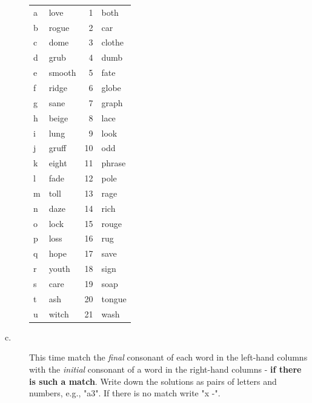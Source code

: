 \documentclass[11pt]{article}
\begin{document}
\begin{problem}{2}
\begin{description}
	\begin{tabular}{l p{6cm} | r l}
		a & love & 1 & both \\
		b & rogue & 2 & car \\
		c & dome & 3 & clothe \\
		d & grub & 4 & dumb \\
		e & smooth & 5 & fate \\
		f & ridge & 6 & globe \\
		g & sane & 7 & graph \\
		h & beige & 8 & lace \\
		i & lung & 9 & look \\
		j & gruff & 10 & odd \\
		k & eight & 11 & phrase \\
		l & fade & 12 & pole \\
		m & toll & 13 & rage \\
		n & daze & 14 & rich \\
		o & lock & 15 & rouge \\
		p & loss & 16 & rug \\
		q & hope & 17 & save \\
		r & youth & 18 & sign \\
		s & care & 19 & soap \\
		t & ash & 20 & tongue \\
		u & witch & 21 & wash
	\end{tabular}

	\newpage
	\item[c.] This time match the \textit{final} consonant of each word in the left-hand columns with the \textit{initial} consonant of a word in the right-hand columns - \textbf{if there is such a match}. Write down the solutions as pairs of letters and numbers, e.g., "a3". If there is no match write "x -".


\end{description}
\end{problem}
\end{document}
